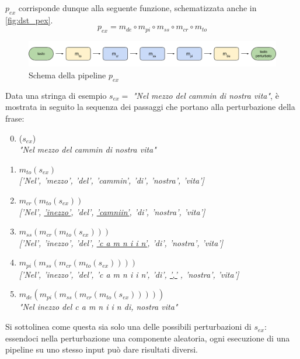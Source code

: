 $p_{ex}$ corrisponde dunque alla seguente funzione, schematizzata anche in \autoref{fig:dst_pex}.
\begin{equation}
p_{ex} = m_{de} \circ m_{pi} \circ m_{ss} \circ m_{cr} \circ m_{to}
\end{equation}

\begin{figure}[H]
\centering
\includegraphics[width=\textwidth]{immagini/dataset/pex}
\caption{Schema della pipeline $p_{ex}$}
\label{fig:dst_pex}
\end{figure}

Data una stringa di esempio $s_{ex} = $ \textit{"Nel mezzo del cammin di nostra vita"}, è mostrata in seguito la sequenza dei passaggi che portano alla perturbazione della frase:
\begin{enumerate}
\setcounter{enumi}{-1}
\item ($s_{ex}$)\\
\textit{"Nel mezzo del cammin di nostra vita"}

\item $m_{to}(s_{ex})$\\
\textit{['Nel', 'mezzo', 'del', 'cammin', 'di', 'nostra', 'vita']}

\item $m_{cr}(m_{to}(s_{ex}))$\\
\textit{['Nel', \underline{'inezzo'}, 'del', \underline{'camniin'}, 'di', 'nostra', 'vita']}

\item $m_{ss}(m_{cr}(m_{to}(s_{ex})))$\\
\textit{['Nel', 'inezzo', 'del', \underline{'c a m n i i n'}, 'di', 'nostra', 'vita']}

\item $m_{pi}(m_{ss}(m_{cr}(m_{to}(s_{ex}))))$\\
\textit{['Nel', 'inezzo', 'del', 'c a m n i i n', 'di', \underline{','} , 'nostra', 'vita']}

\item $m_{de}(m_{pi}(m_{ss}(m_{cr}(m_{to}(s_{ex})))))$\\
\textit{"Nel inezzo del c a m n i i n di, nostra vita"}
\end{enumerate} 

Si sottolinea come questa sia solo una delle possibili perturbazioni di $s_{ex}$: essendoci nella perturbazione una componente aleatoria, ogni esecuzione di una pipeline su uno stesso input può dare risultati diversi.


